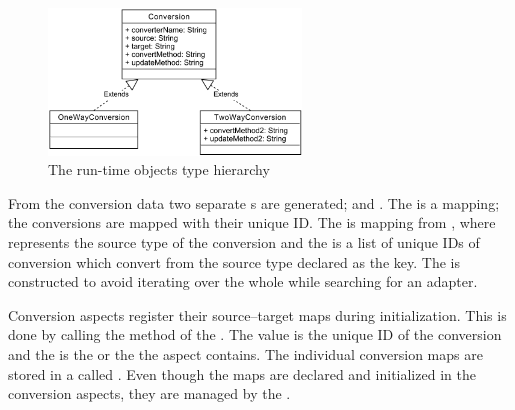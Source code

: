 \begin{figure}[h]
\centering
\includegraphics[width=0.6\textwidth]{chapteradapters/ConversionsUML.pdf}
\caption{The run-time  objects type hierarchy}
\label{fig:convclasses}
\end{figure}

From the conversion data two separate s are generated;  and .
The  is a  mapping; the conversions are mapped with their unique ID.  
The  is mapping from , where  represents the source type of the conversion and the  is a list of unique IDs of conversion which convert from the source type declared as the key. 
The  is constructed to avoid iterating over the whole  while searching for an adapter. 

Conversion aspects register their source--target maps during initialization.
This is done by calling the  method of the . The  value is the unique ID of the conversion and the  is the  or the  the aspect contains. 
The individual conversion maps are stored in a  called .
Even though the maps are declared and initialized in the conversion aspects, they are managed by the .

